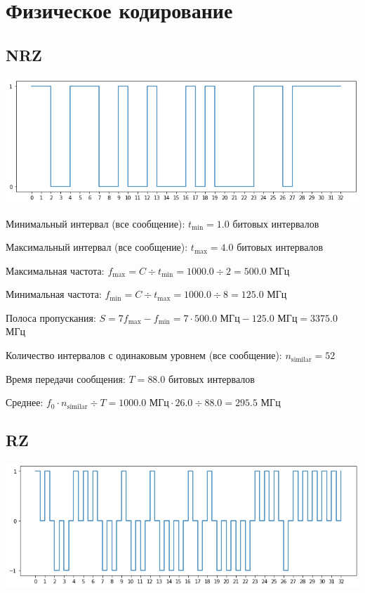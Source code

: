 \section{Физическое кодирование}
\subsection{NRZ}
\includegraphics[width=\textwidth]{3nrz}

Минимальный интервал (все сообщение): $t_\mathrm{min}=1.0$ битовых интервалов

Максимальный интервал (все сообщение): $t_\mathrm{max}=4.0$ битовых интервалов

Максимальная частота: $f_\mathrm{max}=C\div t_\mathrm{min}=1000.0\div 2=500.0$ МГц

Минимальная частота: $f_\mathrm{min}=C\div t_\mathrm{max}=1000.0\div 8=125.0$ МГц

Полоса пропускания: $S=7f_\mathrm{max}-f_\mathrm{min} = 7\cdot 500.0\text{ МГц}-125.0\text{ МГц}=3375.0$ МГц

Количество интервалов с одинаковым уровнем (все сообщение): $n_\mathrm{similar}=52$

Время передачи сообщения: $T=88.0$ битовых интервалов

Среднее: $f_0\cdot n_\mathrm{similar}\div T=1000.0\text{ МГц}\cdot 26.0\div 88.0=295.5$ МГц

\subsection{RZ}
\includegraphics[width=\textwidth]{3rz}


